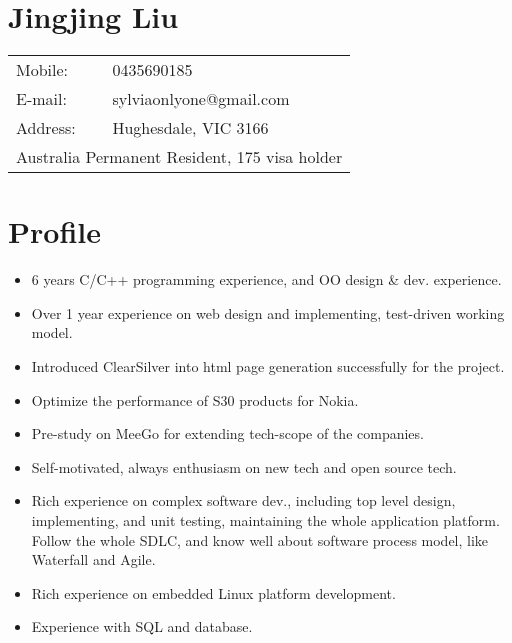 \documentclass[a4paper,11pt]{article}
\begin{document}

\section*{Jingjing Liu}
\begin{tabular}{l l}
Mobile:  & 0435690185 \\
E-mail:  & sylviaonlyone@gmail.com \\
Address: & Hughesdale, VIC 3166 \\
\multicolumn{2}{l}{Australia Permanent Resident, 175 visa holder} \\
\end{tabular}

\section*{Profile}
\begin{itemize}
\item 6 years C/C++ programming experience, and OO design \& dev. experience.
\item Over 1 year experience on web design and implementing, test-driven working model.
\item Introduced ClearSilver into html page generation successfully for the project.
\item Optimize the performance of S30 products for Nokia.
\item Pre-study on MeeGo for extending tech-scope of the companies.
\item Self-motivated, always enthusiasm on new tech and open source tech.
\item Rich experience on complex software dev., including top level design, implementing, and unit testing, maintaining the whole application platform. Follow the whole SDLC, and know well about software process model, like Waterfall and Agile.
\item Rich experience on embedded Linux platform development.
\item Experience with SQL and database.
\end{itemize}

\end{document}
